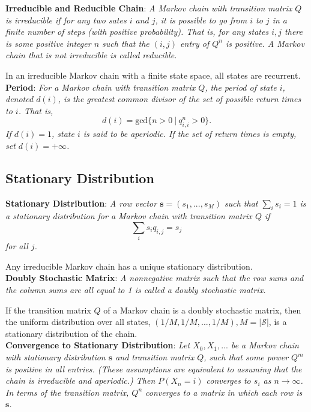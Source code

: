 \documentclass{progartcn}
\begin{document}
		\textbf{Irreducible and Reducible Chain}: \textit{A Markov chain with transition matrix $Q$ is irreducible if for any two sates $i$ and $j$, it is possible to go from $i$ to $j$ in a finite number of steps (with positive probability). That is, for any states $i,j$ there is some positive integer $n$ such that the $(i,j)$ entry of $Q^{n}$ is positive. A Markov chain that is not irreducible is called reducible.}

		In an irreducible Markov chain with a finite state space, all states are recurrent.\\

		\textbf{Period}: \textit{For a Markov chain with transition matrix $Q$, the period of state $i$, denoted $d(i)$, is the greatest common divisor of the set of possible return times to $i$. That is,}
		\[d(i)=\text{gcd}\{n>0\ |\ q_{i,i}^{n}>0\}.\]
		\textit{If $d(i)=1$, state $i$ is said to be aperiodic. If the set of return times is empty, set $d(i)=+\infty$.}\\

	\subsection{Stationary Distribution}

		\textbf{Stationary Distribution}: \textit{A row vector $\mathbf{s}=(s_1,...,s_M)$ such that $\sum_i s_i=1$ is a stationary distribution for a Markov chain with transition matrix $Q$ if}
		\[\sum_i s_i q_{i,j}=s_j\]
		\textit{for all $j$.}

		Any irreducible Markov chain has a unique stationary distribution.\\

		\textbf{Doubly Stochastic Matrix}: \textit{A nonnegative matrix such that the row sums and the column sums are all equal to 1 is called a doubly stochastic matrix.}

		If the transition matrix $Q$ of a Markov chain is a doubly stochastic matrix, then the uniform distribution over all states, $(1/M,1/M,...,1/M), M=|\mathcal{S}|$, is a stationary distribution of the chain.\\

		\textbf{Convergence to Stationary Distribution}: \textit{Let $X_0, X_1, ...$ be a Markov chain with stationary distribution $\mathbf{s}$ and transition matrix $Q$, such that some power $Q^m$ is positive in all entries. (These assumptions are equivalent to assuming that the chain is irreducible and aperiodic.) Then $P(X_n = i)$ converges to $s_i$ as $n\to \infty$. In terms of the transition matrix, $Q^n$ converges to a matrix in which each row is $\mathbf{s}$.}\\
\end{document}

